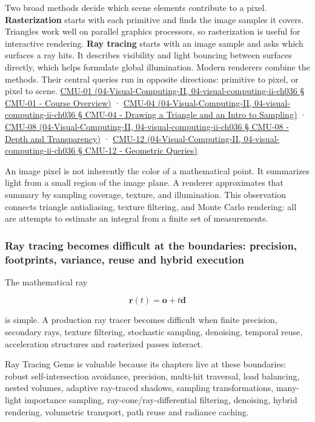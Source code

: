 Two broad methods decide which scene elements contribute to a pixel. \textbf{Rasterization} starts with each primitive and finds the image samples it covers. Triangles work well on parallel graphics processors, so rasterization is useful for interactive rendering. \textbf{Ray tracing} starts with an image sample and asks which surfaces a ray hits. It describes visibility and light bouncing between surfaces directly, which helps formulate global illumination. Modern renderers combine the methods. Their central queries run in opposite directions: primitive to pixel, or pixel to scene. \href{}{CMU-01 (04-Visual-Computing-II, 04-visual-computing-ii-ch036 § CMU-01 - Course Overview)} · \href{}{CMU-04 (04-Visual-Computing-II, 04-visual-computing-ii-ch036 § CMU-04 - Drawing a Triangle and an Intro to Sampling)} · \href{}{CMU-08 (04-Visual-Computing-II, 04-visual-computing-ii-ch036 § CMU-08 - Depth and Transparency)} · \href{}{CMU-12 (04-Visual-Computing-II, 04-visual-computing-ii-ch036 § CMU-12 - Geometric Queries)}

An image pixel is not inherently the color of a mathematical point. It summarizes light from a small region of the image plane. A renderer approximates that summary by sampling coverage, texture, and illumination. This observation connects triangle antialiasing, texture filtering, and Monte Carlo rendering: all are attempts to estimate an integral from a finite set of measurements.

\subsubsection{Ray tracing becomes difficult at the boundaries: precision, footprints, variance, reuse and hybrid execution}\label{ray-tracing-becomes-difficult-at-the-boundaries-precision-footprints-variance-reuse-and-hybrid-execution}

The mathematical ray

\[
\mathbf r(t)=\mathbf o+t\mathbf d
\]

is simple. A production ray tracer becomes difficult when finite precision, secondary rays, texture filtering, stochastic sampling, denoising, temporal reuse, acceleration structures and rasterized passes interact.

Ray Tracing Gems is valuable because its chapters live at these boundaries: robust self-intersection avoidance, precision, multi-hit traversal, load balancing, nested volumes, adaptive ray-traced shadows, sampling transformations, many-light importance sampling, ray-cone/ray-differential filtering, denoising, hybrid rendering, volumetric transport, path reuse and radiance caching.

